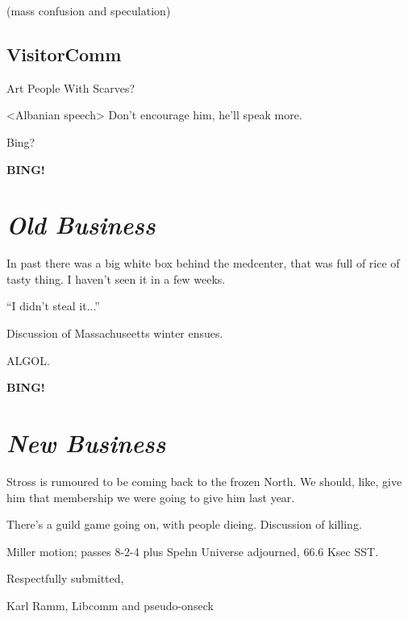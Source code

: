 \documentclass[10pt]{article}
\newcommand{\bing}{{\bf BING!} }
\newcommand{\goto}[1]{\bing \vskip 12pt \section*{{\em{#1}}}}
\newcommand{\ps}{ plus Spehn\xspace}
\begin{document}
(mass confusion and speculation)

\subsection*{VisitorComm}
Art People With Scarves?

<Albanian speech>
Don't encourage him, he'll speak more.

Bing?

\goto{Old Business}

In past there was a big white box behind the medcenter, that was full of
rice of tasty thing.  I haven't seen it in a few weeks.

``I didn't steal it...''

Discussion of Massachuseetts winter ensues.

ALGOL.

\goto{New Business}

Stross is rumoured to be coming back to the frozen North.  We should, like,
give him that membership we were going to give him last year.

There's a guild game going on, with people dieing.  Discussion of killing.

Miller motion; passes 8-2-4 \ps 
\noindent
Universe adjourned, 66.6 Ksec SST.

\vspace{18pt}

\centerline{Respectfully submitted,}
\centerline{Karl Ramm, Libcomm and pseudo-onseck}
\end{document}

